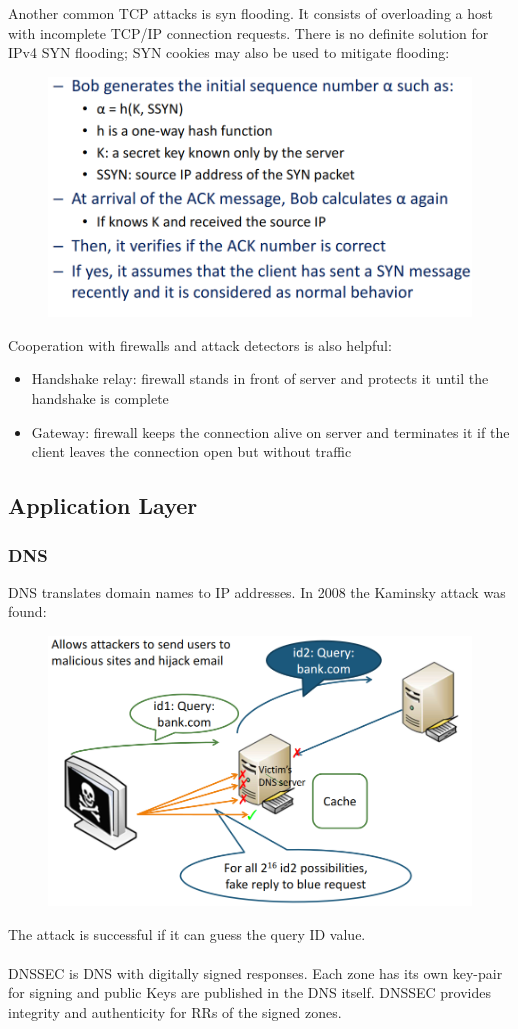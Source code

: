 \documentclass[10pt,a4paper]{report}
\begin{document}
Another common TCP attacks is syn flooding. It consists of overloading a host with incomplete TCP/IP connection requests. There is no definite solution for IPv4 SYN flooding; SYN cookies may also be used to mitigate flooding:
\begin{figure}[H]
\centering
\includegraphics[scale=0.45]{12.png}
\end{figure}
Cooperation with firewalls and attack detectors is also helpful:
\begin{itemize}
\item Handshake relay: firewall stands in front of server and protects it until the handshake is complete
\item Gateway: firewall keeps the connection alive on server and terminates it if the client leaves the connection open but without traffic
\end{itemize}
\subsection{Application Layer}
\subsubsection{DNS}
DNS translates domain names to IP addresses. In 2008 the Kaminsky attack was found:
\begin{figure}[H]
\centering
\includegraphics[scale=0.45]{13.png}
\end{figure}
The attack is successful if it can guess the query ID value.\\
\\
DNSSEC is DNS with digitally signed responses. Each zone has its own key-pair for signing and public Keys are published in the DNS itself. DNSSEC provides integrity and authenticity for RRs of the signed zones.
\end{document}
